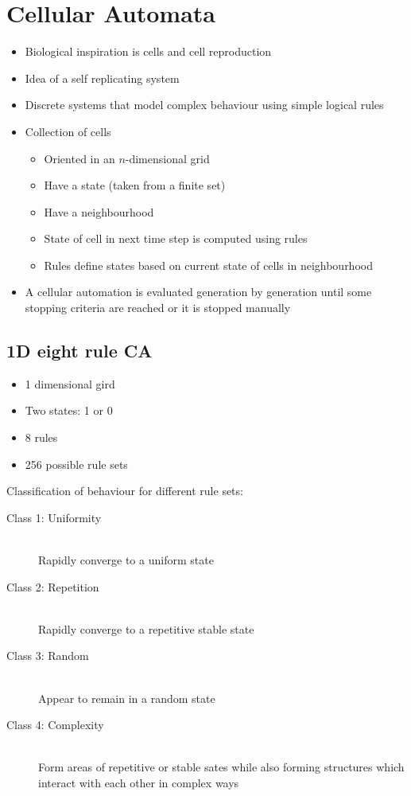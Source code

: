 \documentclass[a4paper]{article}
\begin{document}
\section{Cellular Automata}
\label{sec:ca}

\begin{itemize}
  \item Biological inspiration is cells and cell reproduction
  \item Idea of a self replicating system
  \item Discrete systems that model complex behaviour using simple logical rules
  \item Collection of cells
    \begin{itemize}
      \item Oriented in an $n$-dimensional grid
      \item Have a state (taken from a finite set)
      \item Have a neighbourhood
      \item State of cell in next time step is computed using rules
      \item Rules define states based on current state of cells in
            neighbourhood
    \end{itemize}
  \item A cellular automation is evaluated generation by generation until some
        stopping criteria are reached or it is stopped manually
\end{itemize}

\subsection{1D eight rule CA}

\begin{itemize}
  \item 1 dimensional gird
  \item Two states: 1 or 0
  \item 8 rules
  \item 256 possible rule sets
\end{itemize}

Classification of behaviour for different rule sets:

\begin{description}
  \item[Class 1: Uniformity] \hfill \\
    Rapidly converge to a uniform state
  \item[Class 2: Repetition] \hfill \\
    Rapidly converge to a repetitive stable state
  \item[Class 3: Random] \hfill \\
    Appear to remain in a random state
  \item[Class 4: Complexity] \hfill \\
    Form areas of repetitive or stable sates while also forming structures which
    interact with each other in complex ways
\end{description}
\end{document}
